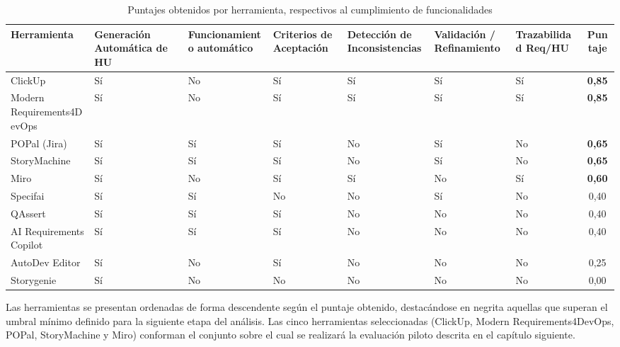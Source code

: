 \begin{table}
    \centering
    \caption{Puntajes obtenidos por herramienta, respectivos al cumplimiento de funcionalidades}
    \label{tab:herramientas_hu}
    \scriptsize
    \renewcommand{\arraystretch}{1.3}

    \begin{tabularx}{\textheight}{|
        X|
        >{\centering\arraybackslash}X|
        >{\centering\arraybackslash}X|
        >{\centering\arraybackslash}X|
        >{\centering\arraybackslash}X|
        >{\centering\arraybackslash}X|
        >{\centering\arraybackslash}X|
        c|}
        \hline
        \textbf{Herramienta} & 
        \textbf{Generación Automática de HU} & 
        \textbf{Funcionamiento automático} &
        \textbf{Criterios de Aceptación} & 
        \textbf{Detección de Inconsistencias} & 
        \textbf{Validación / Refinamiento} & 
        \textbf{Trazabilidad Req/HU} & 
        \textbf{Puntaje} \\ \hline
        ClickUp                    & Sí & No & Sí & Sí & Sí & Sí & \textbf{0,85} \\ \hline
        Modern Requirements4DevOps & Sí & No & Sí & Sí & Sí & Sí & \textbf{0,85} \\ \hline
        POPal (Jira)               & Sí & Sí & Sí & No & Sí & No & \textbf{0,65} \\ \hline
        StoryMachine               & Sí & Sí & Sí & No & Sí & No & \textbf{0,65} \\ \hline
        Miro                       & Sí & No & Sí & Sí & No & Sí & \textbf{0,60} \\ \hline
        Specifai                   & Sí & Sí & No & No & Sí & No & 0,40 \\ \hline
        QAssert                    & Sí & Sí & Sí & No & No & No & 0,40 \\ \hline
        AI Requirements Copilot    & Sí & Sí & Sí & No & No & No & 0,40 \\ \hline
        AutoDev Editor             & Sí & No & Sí & No & No & No & 0,25 \\ \hline
        Storygenie                 & Sí & No & No & No & No & No & 0,00 \\ \hline

    \end{tabularx}

\end{table}

Las herramientas se presentan ordenadas de forma descendente según el puntaje obtenido, destacándose en negrita aquellas que superan el umbral mínimo definido para la siguiente etapa del análisis. Las cinco herramientas seleccionadas (ClickUp, Modern Requirements4DevOps, POPal, StoryMachine y Miro) conforman el conjunto sobre el cual se realizará la evaluación piloto descrita en el capítulo siguiente.

